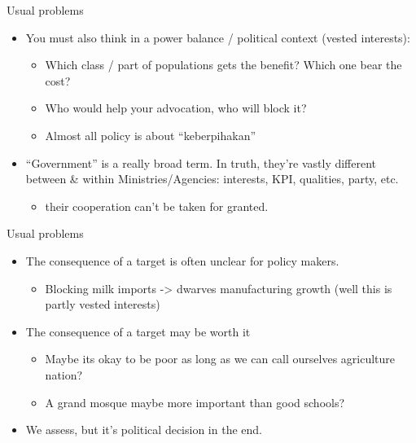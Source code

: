 \documentclass[
  ignorenonframetext,
]{beamer}
\providecommand{\tightlist}{%
  \setlength{\itemsep}{0pt}\setlength{\parskip}{0pt}}\usepackage{longtable,booktabs,array}
\begin{document}
\begin{frame}{Usual problems}
\protect\hypertarget{usual-problems-1}{}
\begin{itemize}
\item
  You must also think in a power balance / political context (vested
  interests):

  \begin{itemize}
  \item
    Which class / part of populations gets the benefit? Which one bear
    the cost?
  \item
    Who would help your advocation, who will block it?
  \item
    Almost all policy is about ``keberpihakan''
  \end{itemize}
\item
  ``Government'' is a really broad term. In truth, they're vastly
  different between \& within Ministries/Agencies: interests, KPI,
  qualities, party, etc.

  \begin{itemize}
  \tightlist
  \item
    their cooperation can't be taken for granted.
  \end{itemize}
\end{itemize}
\end{frame}

\begin{frame}{Usual problems}
\protect\hypertarget{usual-problems-2}{}
\begin{itemize}
\item
  The consequence of a target is often unclear for policy makers.

  \begin{itemize}
  \tightlist
  \item
    Blocking milk imports -\textgreater{} dwarves manufacturing growth
    (well this is partly vested interests)
  \end{itemize}
\item
  The consequence of a target may be worth it

  \begin{itemize}
  \item
    Maybe its okay to be poor as long as we can call ourselves
    agriculture nation?
  \item
    A grand mosque maybe more important than good schools?
  \end{itemize}
\item
  We assess, but it's political decision in the end.
\end{itemize}
\end{frame}
\end{document}
